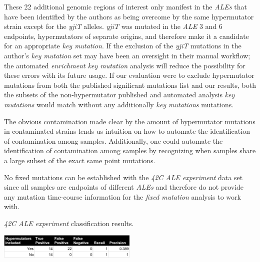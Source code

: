 \documentclass[12pt,final,masters,chapterheads]{ucsd}  %
\begin{document}
These 22 additional genomic regions of interest only manifest in the \textit{ALEs} that have been identified by the authors as being overcome by the same hypermutator strain except for the \textit{yjiT} alleles. \textit{yjiT} was mutated in the \textit{ALE} 3 and 6 endpoints, hypermutators of separate origins, and therefore make it a candidate for an appropriate \textit{key mutation}. If the exclusion of the \textit{yjiT} mutations in the author's \textit{key mutation} set may have been an oversight in their manual workflow; the automated \textit{enrichment key mutation} analysis will reduce the possibility for these errors with its future usage. If our evaluation were to exclude hypermutator mutations from both the published significant mutations list and our results, both the subsets of the non-hypermutator published and automated analysis \textit{key mutations} would match without any additionally \textit{key mutations} mutations. 

The obvious contamination made clear by the amount of hypermutator mutations in contaminated strains lends us intuition on how to automate the identification of contamination among samples. Additionally, one could automate the identification of contamination among samples by  recognizing when samples share a large subset of the exact same point mutations.

No fixed mutations can be established with the \textit{42C} \textit{ALE experiment} data set since all samples are endpoints of different \textit{ALEs} and therefore do not provide any mutation time-course information for the \textit{fixed mutation} analysis to work with.
\begin{table}[H]
  \centering
   \caption{\textit{42C} \textit{ALE experiment} classification results.}
  \includegraphics[width=0.5\textwidth]{42c_precision_recall.png}
\end{table}
\end{document}
